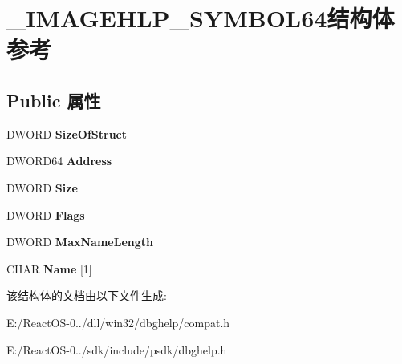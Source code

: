 \hypertarget{struct___i_m_a_g_e_h_l_p___s_y_m_b_o_l64}{}\section{\+\_\+\+I\+M\+A\+G\+E\+H\+L\+P\+\_\+\+S\+Y\+M\+B\+O\+L64结构体 参考}
\label{struct___i_m_a_g_e_h_l_p___s_y_m_b_o_l64}
\subsection*{Public 属性}
\begin{DoxyCompactItemize}
\item 
\mbox{\label{struct___i_m_a_g_e_h_l_p___s_y_m_b_o_l64_a8c1bc2605fd959caf0c66bb8514a2748}} 
D\+W\+O\+RD {\bfseries Size\+Of\+Struct}
\item 
\mbox{\label{struct___i_m_a_g_e_h_l_p___s_y_m_b_o_l64_a40225e365f7b6be12aded716d1274052}} 
D\+W\+O\+R\+D64 {\bfseries Address}
\item 
\mbox{\label{struct___i_m_a_g_e_h_l_p___s_y_m_b_o_l64_a2e161070e214274e315ee0461dd0b17b}} 
D\+W\+O\+RD {\bfseries Size}
\item 
\mbox{\label{struct___i_m_a_g_e_h_l_p___s_y_m_b_o_l64_a2655b60367f6a33048ba20f5bbbf6e21}} 
D\+W\+O\+RD {\bfseries Flags}
\item 
\mbox{\label{struct___i_m_a_g_e_h_l_p___s_y_m_b_o_l64_a3dca0c5048b9366f333fcfffbaf1b03f}} 
D\+W\+O\+RD {\bfseries Max\+Name\+Length}
\item 
\mbox{\label{struct___i_m_a_g_e_h_l_p___s_y_m_b_o_l64_a61c206af963a67edd9d19473d1b92bba}} 
C\+H\+AR {\bfseries Name} \mbox{[}1\mbox{]}
\end{DoxyCompactItemize}


该结构体的文档由以下文件生成\+:\begin{DoxyCompactItemize}
\item 
E\+:/\+React\+O\+S-\/0../dll/win32/dbghelp/compat.\+h\item 
E\+:/\+React\+O\+S-\/0../sdk/include/psdk/dbghelp.\+h\end{DoxyCompactItemize}
